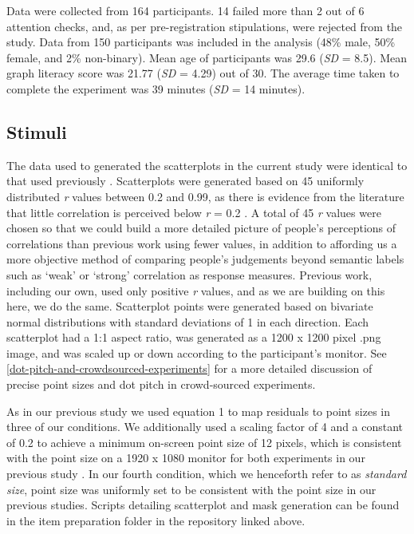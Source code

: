 \documentclass{vgtc}                          %
\begin{document}
Data were collected from 164 participants. 14 failed more than 2 out of 6 attention
checks, and, as per pre-registration stipulations, were rejected from the study. Data
from 150 participants was included in the analysis (48\% male, 50\% female, and 2\% non-binary). Mean age of participants was 29.6 (\emph{SD} = 8.5). Mean graph literacy score was 21.77
(\emph{SD} = 4.29) out of 30. The average time taken to complete
the experiment was 39 minutes (\emph{SD} = 14 minutes).

\hypertarget{stimuli}{%
\subsection{Stimuli}\label{stimuli}}

The data used to generated the scatterplots in the current study were identical to that
used previously \cite{strain_2023}. Scatterplots were generated based on 45 uniformly
distributed \emph{r} values between 0.2 and 0.99, as there is evidence from the literature
that little correlation is perceived below \emph{r} = 0.2 \cite{strahan_1978, bobko_1979, cleveland_1982}.
A total of 45 \emph{r} values were chosen so that we could build a more detailed picture
of people's perceptions of correlations than previous work using fewer values,
in addition to affording us a more objective method of comparing people's judgements
beyond semantic labels such as `weak' or `strong' correlation as response measures.
Previous work, including our own, used only positive \emph{r} values, and as we are building on this
here, we do the same. Scatterplot points were generated based on bivariate normal distributions with
standard deviations of 1 in each direction. Each scatterplot had a 1:1 aspect ratio,
was generated as a 1200 x 1200 pixel .png image, and was
scaled up or down according to the participant's monitor. See
\autoref{dot-pitch-and-crowdsourced-experiments} for a more detailed discussion of
precise point sizes and dot pitch in crowd-sourced experiments.

As in our previous study \cite{strain_2023} we used equation 1 to map residuals
to point sizes in three of our conditions. We additionally used a scaling factor
of 4 and a constant of 0.2 to achieve a minimum on-screen point size of 12 pixels,
which is consistent with the point size on a 1920 x 1080 monitor for both experiments
in our previous study \cite{strain_2023}. In our fourth condition, which we henceforth refer to as \emph{standard size},
point size was uniformly set to be consistent with the point size in our previous
studies. Scripts detailing scatterplot and mask generation can be found in the item
preparation folder in the repository linked above.
\end{document}
